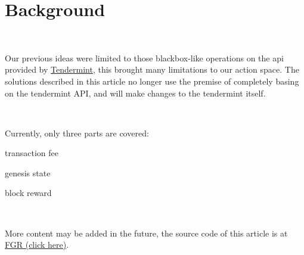 \section{Background}

~\par

Our previous ideas were limited to those blackbox-like operations on the api provided by
\href{https://github.com/tendermint/tendermint}{Tendermint}, this brought many limitations to our action space.
The solutions described in this article no longer use the premise of completely basing on the tendermint API,
and will make changes to the tendermint itself.

~\par

Currently, only three parts are covered:

\begin{ITEMIZE}
    \item  transaction fee
    \item  genesis state
    \item  block reward
\end{ITEMIZE}

~\par

More content may be added in the future, the source code of this article is at \href{https://github.com/FindoraNetwork/fgr}{FGR (click here)}.
